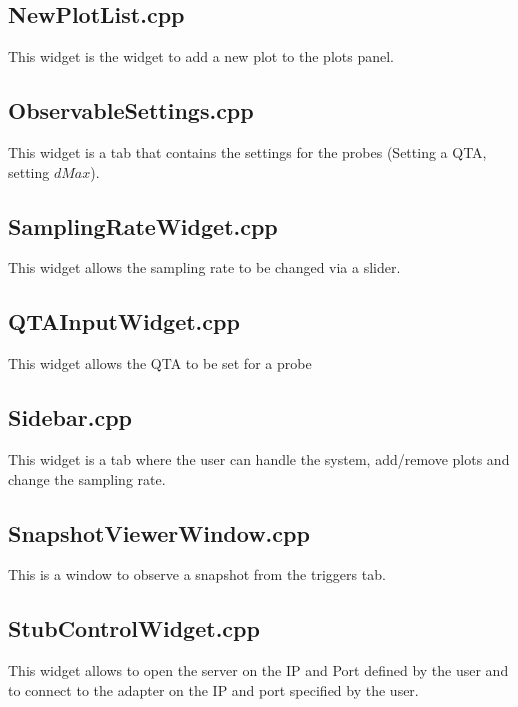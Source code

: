 \subsection{NewPlotList.cpp} \label{code:npl}
This widget is the widget to add a new plot to the plots panel.


\subsection{ObservableSettings.cpp} \label{code:os}
This widget is a tab that contains the settings for the probes (Setting a QTA, setting $dMax$).


\subsection{SamplingRateWidget.cpp} \label{code:srw}
This widget allows the sampling rate to be changed via a slider.


\subsection{QTAInputWidget.cpp} \label{code:qiw}
This widget allows the QTA to be set for a probe


\subsection{Sidebar.cpp} \label{code:side}
This widget is a tab where the user can handle the system, add/remove plots and change the sampling rate.


\subsection{SnapshotViewerWindow.cpp} \label{code:svw}
This is a window to observe a snapshot from the triggers tab.


\subsection{StubControlWidget.cpp} \label{code:scw}
This widget allows to open the server on the IP and Port defined by the user and to connect to the adapter on the IP and port specified by the user.


